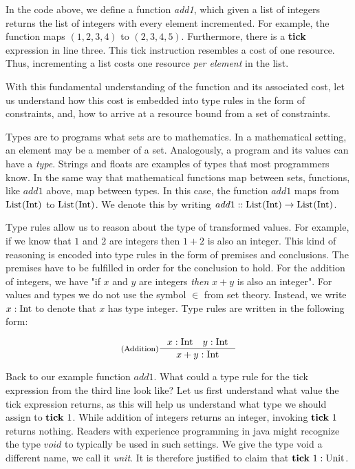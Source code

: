 In the code above, we define a function \emph{add1}, which given a list of integers returns the list of integers with every element incremented. For example, the function maps \((1, 2, 3, 4)\) to \((2, 3, 4, 5)\). Furthermore, there is a \textbf{tick} expression in line three. This tick instruction resembles a cost of one resource. Thus, incrementing a list costs one resource \emph{per element} in the list.

With this fundamental understanding of the function and its associated cost, let us understand how this cost is embedded into type rules in the form of constraints, and, how to arrive at a resource bound from a set of constraints. 

Types are to programs what sets are to mathematics. In a mathematical setting, an element may be a member of a set. Analogously, a program and its values can have a \emph{type}. Strings and floats are examples of types that most programmers know. In the same way that mathematical functions map between sets, functions, like \(add1\) above, map between types. In this case, the function \(add1\) maps from \(\text{List}^{}(\text{Int})\) to \(\text{List}^{}(\text{Int})\). We denote this by writing \(add1 :: \text{List}^{}(\text{Int}) \to \text{List}^{}(\text{Int})\).

Type rules allow us to reason about the type of transformed values. For example, if we know that \(1\) and \(2\) are integers then \(1 + 2\) is also an integer. This kind of reasoning is encoded into type rules in the form of premises and conclusions. The premises have to be fulfilled in order for the conclusion to hold. For the addition of integers, we have "if \(x\) and \(y\) are integers \emph{then} \(x + y\) is also an integer". For values and types we do not use the symbol \(\in\) from set theory. Instead, we write \(x : \text{Int}\) to denote that \(x\) has type integer. Type rules are written in the following form:

\[
   \inference[(Addition)]
   {x : \typeint \quad y : \typeint}
   {x + y : \typeint}
\]

Back to our example function \(add1\). What could a type rule for the tick expression from the third line look like? Let us first understand what value the tick expression returns, as this will help us understand what type we should assign to \(\mathbf{tick}~1\). While addition of integers returns an integer, invoking \(\mathbf{tick}~1\) returns nothing. Readers with experience programming in java might recognize the type \(void\) to typically be used in such settings. We give the type void a different name, we call it \emph{unit}. It is therefore justified to claim that \(\mathbf{tick}~1 : \text{Unit}\). 

